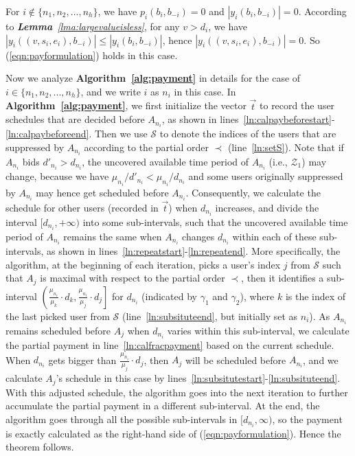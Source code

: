 \documentclass[10pt,journal,compsoc]{IEEEtran}
\begin{document}
  \begin{IEEEproof}
    For $i\not \in \{n_1,n_2,...,n_h\}$, we have $p_i(b_i,b_{-i})=0$ and $|y_i(b_i,b_{-i})|=0$. According to \textit{\textbf{Lemma}~\ref{lma:largevalueisless}}, for any $v>d_i$, we have $|y_i((v,s_i,e_i),b_{-i})|\leq|y_i(b_i,b_{-i})|$, hence $|y_i((v,s_i,e_i),b_{-i})|=0$. So (\ref{eqn:payformulation}) holds in this case.

    Now we analyze \textbf{Algorithm~\ref{alg:payment}} in details for the case of $i\in \{n_1,n_2,...,n_h\}$, and we write $i$ as $n_i$ in this case. In \textbf{Algorithm~\ref{alg:payment}}, we first initialize the vector $\vec{t}$ to record the user schedules that are decided before $A_{n_i}$, as shown in lines~\ref{ln:calpaybeforestart}-\ref{ln:calpaybeforeend}. Then we use $\mathcal{S}$ to denote the indices of the users that are suppressed by $A_{n_i}$ according to the partial order $\prec$ (line~\ref{ln:setS}). Note that if $A_{n_i}$ bids $d'_{n_i}> d_{n_i}$, the uncovered available time period of $A_{n_i}$ (i.e., $\mathcal{Z}_1$) may change, because we have $\mu_{n_i}/d'_{n_i}<\mu_{n_i}/d_{n_i}$ and some users originally suppressed by $A_{n_i}$ may hence get scheduled before $A_{n_i}$. Consequently, we calculate the schedule for other users (recorded in $\vec{t}$) when $d_{n_i}$ increases, and divide the interval $[d_{n_i},+\infty)$ into some sub-intervals, such that the uncovered available time period of $A_{n_i}$ remains the same when $A_{n_i}$ changes $d_{n_i}$ within each of these sub-intervals, as shown in lines~\ref{ln:repeatstart}-\ref{ln:repeatend}. More specifically, the algorithm, at the beginning of each iteration, picks a user's index $j$ from $\mathcal{S}$ such that $A_j$ is maximal with respect to the partial order $\prec$, then it identifies a sub-interval $\left(\left.\frac{\mu_{n_i}}{\mu_{{k}}}\cdot d_{{k}},\frac{\mu_{n_i}}{\mu_{{j}}}\cdot d_{{j}}\right]\right.$ for $d_{n_i}$ (indicated by $\gamma_1$ and $\gamma_2$), where $k$ is the index of the last picked user from $\mathcal{S}$ (line~\ref{ln:subsituteend}, but initially set as $n_i$). As $A_{n_i}$ remains scheduled before $A_j$ when $d_{n_i}$ varies within this sub-interval, we calculate the partial payment in line~\ref{ln:calfracpayment} based on the current schedule. When $d_{n_i}$ gets bigger than $\frac{\mu_{n_i}}{\mu_{{j}}}\cdot d_{{j}}$, then $A_j$ will be scheduled before $A_{n_i}$, and we calculate $A_{j}$'s schedule in this case by lines~\ref{ln:subsitutestart}-\ref{ln:subsituteend}. With this adjusted schedule, the algorithm goes into the next iteration to further accumulate the partial payment in a different sub-interval.
At the end, the algorithm goes through all the possible sub-intervals in $[d_{n_i}, \infty)$, so the payment is exactly calculated as the right-hand side of (\ref{eqn:payformulation}). Hence the theorem follows.
  \end{IEEEproof}
\end{document}
